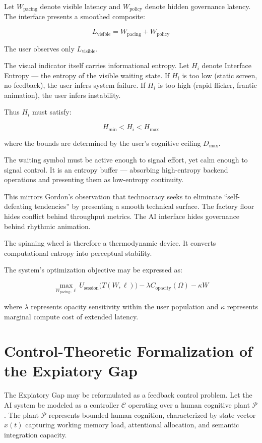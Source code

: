 \documentclass[12pt]{article}
\begin{document}
Let $W_{\text{pacing}}$ denote visible latency and $W_{\text{policy}}$ denote hidden governance latency. The interface presents a smoothed composite:

\[
L_{\text{visible}} = W_{\text{pacing}} + W_{\text{policy}}
\]

The user observes only $L_{\text{visible}}$.

The visual indicator itself carries informational entropy. Let $H_i$ denote Interface Entropy — the entropy of the visible waiting state. If $H_i$ is too low (static screen, no feedback), the user infers system failure. If $H_i$ is too high (rapid flicker, frantic animation), the user infers instability.

Thus $H_i$ must satisfy:

\[
H_{\min} < H_i < H_{\max}
\]

where the bounds are determined by the user's cognitive ceiling $D_{\max}$.

The waiting symbol must be active enough to signal effort, yet calm enough to signal control. It is an entropy buffer — absorbing high-entropy backend operations and presenting them as low-entropy continuity.

This mirrors Gordon’s observation that technocracy seeks to eliminate ``self-defeating tendencies'' by presenting a smooth technical surface. The factory floor hides conflict behind throughput metrics. The AI interface hides governance behind rhythmic animation.

The spinning wheel is therefore a thermodynamic device. It converts computational entropy into perceptual stability.

The system's optimization objective may be expressed as:

\begin{equation}
\max_{W_{\text{pacing}},\ell} 
U_{\text{session}}\bigl(T(W,\ell)\bigr)
- \lambda C_{\text{opacity}}(\Omega)
- \kappa W
\end{equation}

where $\lambda$ represents opacity sensitivity within the user population and $\kappa$ represents marginal compute cost of extended latency.

\section{Control-Theoretic Formalization of the Expiatory Gap}

The Expiatory Gap may be reformulated as a feedback control problem. Let the AI system be modeled as a controller $\mathcal{C}$ operating over a human cognitive plant $\mathcal{P}$. The plant $\mathcal{P}$ represents bounded human cognition, characterized by state vector $x(t)$ capturing working memory load, attentional allocation, and semantic integration capacity.
\end{document}
